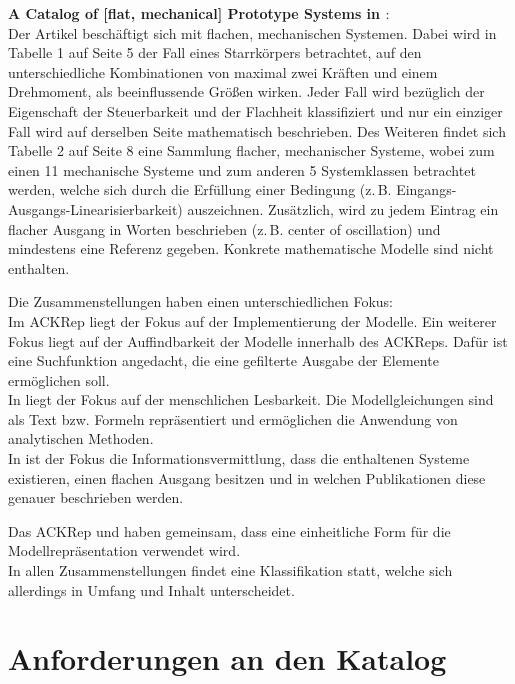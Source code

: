 \textbf{A Catalog of [flat, mechanical] Prototype Systems in \cite{MURASL95}}:\\
Der Artikel \cite{MURASL95} beschäftigt sich mit flachen, mechanischen Systemen. Dabei wird in Tabelle 1 auf Seite 5 der Fall eines Starrkörpers betrachtet, auf den unterschiedliche Kombinationen von maximal zwei Kräften und einem Drehmoment, als beeinflussende Größen wirken. Jeder Fall wird bezüglich der Eigenschaft der Steuerbarkeit und der Flachheit klassifiziert und nur ein einziger Fall wird auf derselben Seite mathematisch beschrieben. Des Weiteren findet sich Tabelle 2 auf Seite 8 eine Sammlung flacher, mechanischer Systeme, wobei zum einen 11 mechanische Systeme und zum anderen 5 Systemklassen betrachtet werden, welche sich durch die Erfüllung einer Bedingung (z.\,B. Eingangs-Ausgangs-Linearisierbarkeit) auszeichnen. Zusätzlich, wird zu jedem Eintrag ein flacher Ausgang in Worten beschrieben (z.\,B. center of oscillation) und mindestens eine Referenz gegeben. Konkrete mathematische Modelle sind nicht enthalten.

Die Zusammenstellungen haben einen unterschiedlichen Fokus:\\
Im ACKRep liegt der Fokus auf der Implementierung der Modelle. Ein weiterer Fokus liegt auf der Auffindbarkeit der Modelle innerhalb des ACKReps. Dafür ist eine Suchfunktion angedacht, die eine gefilterte Ausgabe der Elemente ermöglichen soll.\\
In \cite{LIYU13} liegt der Fokus auf der menschlichen Lesbarkeit. Die Modellgleichungen sind als Text bzw. Formeln repräsentiert und ermöglichen die Anwendung von analytischen Methoden. \\
In \cite{MURASL95} ist der Fokus die Informationsvermittlung, dass die enthaltenen Systeme existieren, einen flachen Ausgang besitzen und in welchen Publikationen diese genauer beschrieben werden.

Das ACKRep und \cite{LIYU13} haben gemeinsam, dass eine einheitliche Form für die Modellrepräsentation verwendet wird. \\
In allen Zusammenstellungen findet eine Klassifikation statt, welche sich allerdings in Umfang und Inhalt unterscheidet.

\section{Anforderungen an den Katalog} 
\label{Ch:Vorbetrachtung:Sec:Anforderungen}

